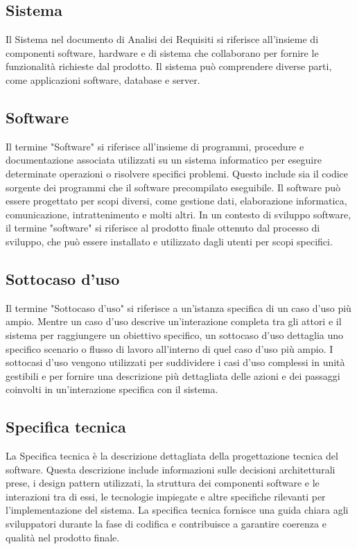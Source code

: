 \subsection{Sistema} 
Il Sistema nel documento di Analisi dei Requisiti si riferisce all'insieme di componenti software, hardware e di sistema che collaborano per fornire le funzionalità richieste dal prodotto. Il sistema può comprendere diverse parti, come applicazioni software, database e server.
\subsection{Software} 
Il termine "Software" si riferisce all'insieme di programmi, procedure e documentazione associata utilizzati su un sistema informatico per eseguire determinate operazioni o risolvere specifici problemi. Questo include sia il codice sorgente dei programmi che il software precompilato eseguibile. Il software può essere progettato per scopi diversi, come gestione dati, elaborazione informatica, comunicazione, intrattenimento e molti altri. In un contesto di sviluppo software, il termine "software" si riferisce al prodotto finale ottenuto dal processo di sviluppo, che può essere installato e utilizzato dagli utenti per scopi specifici. 
\subsection{Sottocaso d'uso} 
Il termine "Sottocaso d'uso" si riferisce a un'istanza specifica di un caso d'uso più ampio. Mentre un caso d'uso descrive un'interazione completa tra gli attori e il sistema per raggiungere un obiettivo specifico, un sottocaso d'uso dettaglia uno specifico scenario o flusso di lavoro all'interno di quel caso d'uso più ampio. I sottocasi d'uso vengono utilizzati per suddividere i casi d'uso complessi in unità gestibili e per fornire una descrizione più dettagliata delle azioni e dei passaggi coinvolti in un'interazione specifica con il sistema. 
\subsection{Specifica tecnica} 
La Specifica tecnica è la descrizione dettagliata della progettazione tecnica del software. Questa descrizione include informazioni sulle decisioni architetturali prese, i design pattern utilizzati, la struttura dei componenti software e le interazioni tra di essi, le tecnologie impiegate e altre specifiche rilevanti per l'implementazione del sistema. La specifica tecnica fornisce una guida chiara agli sviluppatori durante la fase di codifica e contribuisce a garantire coerenza e qualità nel prodotto finale. 
